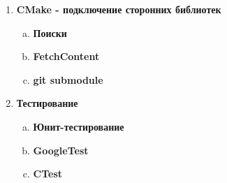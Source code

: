 \documentclass{article}
\begin{document}
\begin{enumerate}
\item \textbf{CMake - подключение сторонних библиотек}

\begin{enumerate}[a.]
\item \textbf{Поиски}\\
\item \textbf{FetchContent}\\
\item \textbf{git submodule}\\
\end{enumerate}


\item \textbf{Тестирование}
\begin{enumerate}[a.]
\item \textbf{Юнит-тестирование}\\
\item \textbf{GoogleTest}\\
\item \textbf{CTest}\\
\end{enumerate}




\end{enumerate}
\end{document}
